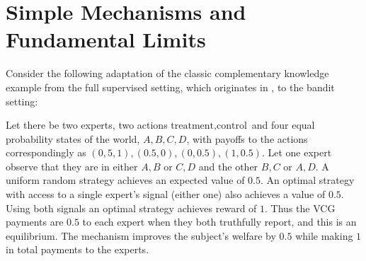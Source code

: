







\section{Simple Mechanisms and Fundamental Limits}

Consider the following adaptation of the classic complementary knowledge example from the full supervised setting, which originates in \cite{geanakoplos1982we}, to the bandit setting:

\begin{eg}\label{eg:comp-ex}
	Let there be two experts, two actions ${\text{treatment},\text{control}}$ and four equal probability states of the world, ${A,B,C,D}$, with payoffs to the actions correspondingly as ${(0,5,1),(0.5,0),(0,0.5),(1,0.5)}$. Let one expert observe that they are in either ${A,B}$ or ${C,D}$ and the other ${B,C}$ or ${A,D}$. A uniform random strategy achieves an expected value of $0.5$. An optimal strategy with access to a single expert's signal (either one) also achieves a value of $0.5$. Using both signals an optimal strategy achieves reward of $1$. Thus the VCG payments are $0.5$ to each expert when they both truthfully report, and this is an equilibrium. The mechanism improves the subject's welfare by $0.5$ while making $1$ in total payments to the experts. 
\end{eg}

